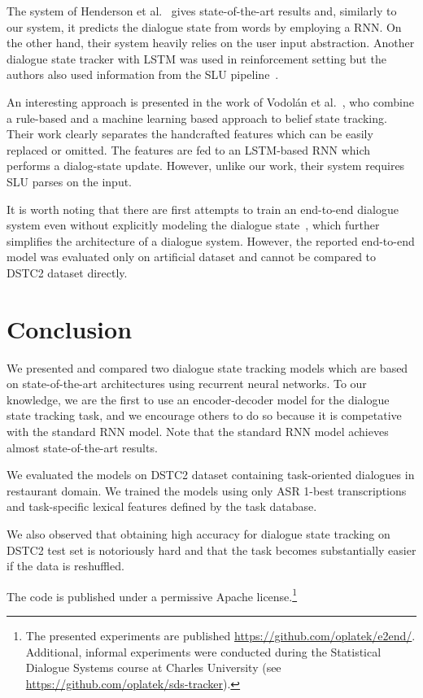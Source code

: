 \documentclass{itatnew}
\begin{document}
The system of Henderson et al.~\cite{henderson2014word} gives state-of-the-art results and, similarly to our system, it predicts the dialogue state from words by employing a RNN.
On the other hand, their system heavily relies on the user input abstraction.
Another dialogue state tracker with LSTM was used in reinforcement setting but the authors also used information from the SLU pipeline~\cite{lee2016dialog}.

An interesting approach is presented in the work of Vodolán et al.~\cite{vodolan2015hybrid}, who combine a rule-based and a machine learning based approach to belief state tracking.
Their work clearly separates the handcrafted features which can be easily replaced or omitted.
The features are fed to an LSTM-based RNN which performs a dialog-state update.
However, unlike our work, their system requires SLU parses on the input.

It is worth noting that there are first attempts to train an end-to-end dialogue system even without explicitly modeling the dialogue state~\cite{bordes2016learning}, which further simplifies the architecture of a dialogue system.
However, the reported end-to-end model was evaluated only on artificial dataset and cannot be compared to DSTC2 dataset directly.

\section{Conclusion}
\label{sec:conc}

We presented and compared two dialogue state tracking models which are based on state-of-the-art architectures using recurrent neural networks.
To our knowledge, we are the first to use an encoder-decoder model for the dialogue state tracking task, and we encourage others to do so because it is competative with the standard RNN model. 
Note that the standard RNN model achieves almost state-of-the-art results.

We evaluated the models on DSTC2 dataset containing task-oriented dialogues in restaurant domain. 
We trained the models using only ASR 1-best transcriptions and task-specific lexical features defined by the task database.

We also observed that obtaining high accuracy for dialogue state tracking on DSTC2 test set is notoriously hard and that the task becomes substantially easier if the data is reshuffled.

The code is published under a permissive Apache license.\footnote{The presented experiments are published \url{https://github.com/oplatek/e2end/}. Additional, informal experiments were conducted during the Statistical Dialogue Systems course at Charles University (see \url{https://github.com/oplatek/sds-tracker}).}
\end{document}
